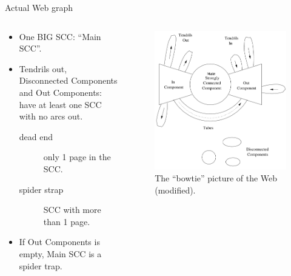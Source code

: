 \documentclass[10pt]{beamer}
\begin{document}
\begin{frame}{Actual Web graph}
  \begin{columns}
    \begin{column}{0.5\textwidth}
      \begin{itemize}
        \item One BIG SCC: ``Main SCC''.
        \item Tendrils out, Disconnected Components and Out Components:
          have at least one SCC with no arcs out.
          \begin{description}
            \item[dead end] only 1 page in the SCC.
            \item[spider strap] SCC with more than 1 page.
          \end{description}
        \item If Out Components is empty, Main SCC is a spider trap.
      \end{itemize}
    \end{column}
    \begin{column}{0.5\textwidth}
      \begin{figure}
        \includegraphics[trim=.5cm 0cm .2cm 0cm,clip,width=\linewidth]{web-graph.png}
        \caption{The ``bowtie'' picture of the Web \cite[p.~187]{leskovec2014mining} (modified).}
        \label{fig:web-graph}
      \end{figure}
    \end{column}
  \end{columns}
\end{frame}
\end{document}
